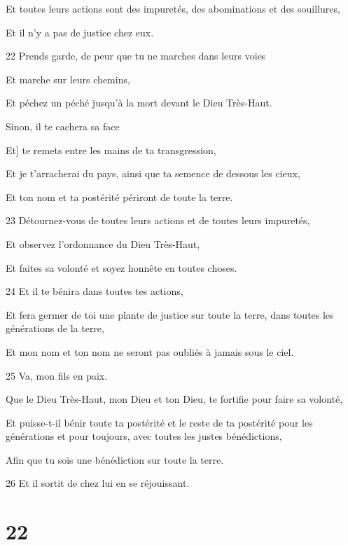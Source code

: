 \par     Et toutes leurs actions sont des impuretés, des abominations et des souillures,  
\par     Et il n’y a pas de justice chez eux.
\par    
\par 22 Prends garde, de peur que tu ne marches dans leurs voies  
\par     Et marche sur leurs chemins,  
\par     Et péchez un péché jusqu'à la mort devant le Dieu Très-Haut.
\par    
\par     Sinon, il te cachera sa face  
\par     Et] te remets entre les mains de ta transgression,  
\par     Et je t'arracherai du pays, ainsi que ta semence de dessous les cieux,  
\par     Et ton nom et ta postérité périront de toute la terre.
\par    
\par 23 Détournez-vous de toutes leurs actions et de toutes leurs impuretés,  
\par     Et observez l'ordonnance du Dieu Très-Haut,  
\par     Et faites sa volonté et soyez honnête en toutes choses.
\par    
\par 24 Et il te bénira dans toutes tes actions,  
\par     Et fera germer de toi une plante de justice sur toute la terre, dans toutes les générations de la terre,  
\par     Et mon nom et ton nom ne seront pas oubliés à jamais sous le ciel.
\par    
\par 25 Va, mon fils en paix.  
\par     Que le Dieu Très-Haut, mon Dieu et ton Dieu, te fortifie pour faire sa volonté,  
\par     Et puisse-t-il bénir toute ta postérité et le reste de ta postérité pour les générations et pour toujours, avec toutes les justes bénédictions,  
\par     Afin que tu sois une bénédiction sur toute la terre.
\par    
\par 26 Et il sortit de chez lui en se réjouissant.

\chapter{22}


